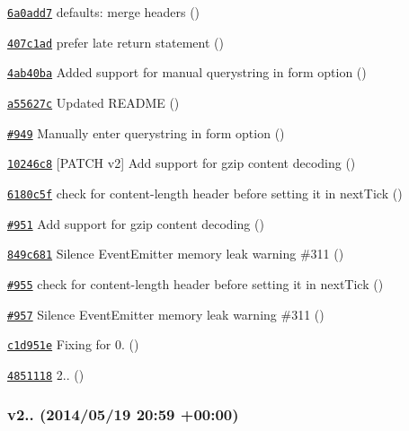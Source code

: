 \begin{DoxyItemize}
\item \href{https://github.com/mikeal/request/commit/6a0add70b2687cf751b3446a15a513a1fd141738}{\tt 6a0add7} defaults\+: merge headers ()
\item \href{https://github.com/mikeal/request/commit/407c1ada61afca4d4ba50155c6d9430754541df1}{\tt 407c1ad} prefer late return statement ()
\item \href{https://github.com/mikeal/request/commit/4ab40ba2f9aca8958cab149eb9cfbd9edb5534aa}{\tt 4ab40ba} Added support for manual querystring in form option ()
\item \href{https://github.com/mikeal/request/commit/a55627cd9f468cefb2971bb501ebc0c2fc27aa8b}{\tt a55627c} Updated R\+E\+A\+D\+M\+E ()
\item \href{https://github.com/mikeal/request/pull/949}{\tt \#949} Manually enter querystring in form option ()
\item \href{https://github.com/mikeal/request/commit/10246c84819db14b32fccca040029b06449242a3}{\tt 10246c8} \mbox{[}P\+A\+T\+C\+H v2\mbox{]} Add support for gzip content decoding ()
\item \href{https://github.com/mikeal/request/commit/6180c5f45c01fb2158b9a44f894a34263479fa84}{\tt 6180c5f} check for content-\/length header before setting it in next\+Tick ()
\item \href{https://github.com/mikeal/request/pull/951}{\tt \#951} Add support for gzip content decoding ()
\item \href{https://github.com/mikeal/request/commit/849c681846ce3b5492bd47261de391377a3ac19b}{\tt 849c681} Silence Event\+Emitter memory leak warning \#311 ()
\item \href{https://github.com/mikeal/request/pull/955}{\tt \#955} check for content-\/length header before setting it in next\+Tick ()
\item \href{https://github.com/mikeal/request/pull/957}{\tt \#957} Silence Event\+Emitter memory leak warning \#311 ()
\item \href{https://github.com/mikeal/request/commit/c1d951e536bd41c957f0cade41d051c9d41d1462}{\tt c1d951e} Fixing for 0. ()
\item \href{https://github.com/mikeal/request/commit/48511186495888a5f0cb15a107325001ac91990e}{\tt 4851118} 2.. ()
\end{DoxyItemize}

\subsubsection*{v2.. (2014/05/19 20\+:59 +00\+:00)}


